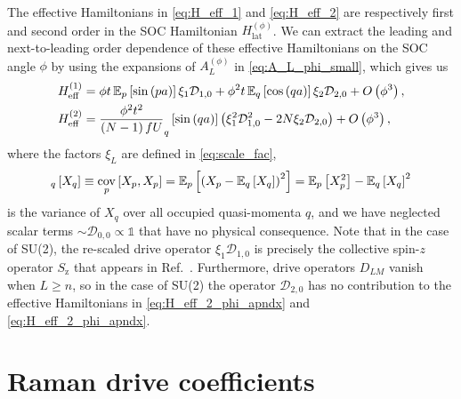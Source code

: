 \documentclass[nofootinbib,notitlepage,11pt]{revtex4-2}
\renewcommand{\t}{\text} %
\newcommand{\f}[2]{\dfrac{#1}{#2}} %
\newcommand{\p}[1]{\left(#1\right)} %
\renewcommand{\sp}[1]{\left[#1\right]} %
\newcommand{\1}{\mathds{1}}
\newcommand{\z}{\text{z}}
\newcommand{\D}{\mathcal{D}}
\newcommand{\EE}{\mathbb{E}}
\DeclareMathOperator{\cov}{cov}
\let\var\relax
\DeclareMathOperator{\var}{var}
\begin{document}
The effective Hamiltonians in \eqref{eq:H_eff_1} and
\eqref{eq:H_eff_2} are respectively first and second order in the SOC
Hamiltonian $H_{\t{lat}}^{(\phi)}$.  We can extract the leading and
next-to-leading order dependence of these effective Hamiltonians on
the SOC angle $\phi$ by using the expansions of $A_L^{(\phi)}$ in
\eqref{eq:A_L_phi_small}, which gives us
\begin{align}
  H_{\t{eff}}^{(1)}
  &= \phi t \, \EE_p\sp{\sin\p{pa}} \xi_1 \D_{1,0}
  + \phi^2 t \, \EE_q\sp{\cos\p{qa}} \xi_2 \D_{2,0}
  + O\p{\phi^3},
  \label{eq:H_eff_1_phi_apndx} \\
  H_{\t{eff}}^{(2)}
  &= \f{\phi^2 t^2}{\p{N-1}fU} \var_q\sp{\sin\p{qa}}
  \p{\xi_1^2 \D_{1,0}^2 - 2 N \xi_2 \D_{2,0}}
  + O\p{\phi^3},
  \label{eq:H_eff_2_phi_apndx}
\end{align}
where the factors $\xi_L$ are defined in \eqref{eq:scale_fac},
\begin{align}
  \var_q\sp{X_q} \equiv \cov_p\sp{X_p,X_p}
  = \EE_p\sp{\p{X_p-\EE_q\sp{X_q}}^2}
  = \EE_p\sp{X_p^2} - \EE_q\sp{X_q}^2
\end{align}
is the variance of $X_q$ over all occupied quasi-momenta $q$, and we
have neglected scalar terms $\sim\D_{0,0}\propto\1$ that have no
physical consequence.  Note that in the case of SU(2), the re-scaled
drive operator $\xi_1\D_{1,0}$ is precisely the collective spin-$z$
operator $S_\z$ that appears in Ref.~\cite{he2019engineering}.
Furthermore, drive operators $D_{LM}$ vanish when $L\ge n$, so in the
case of SU(2) the operator $\D_{2,0}$ has no contribution to the
effective Hamiltonians in \eqref{eq:H_eff_2_phi_apndx} and
\eqref{eq:H_eff_2_phi_apndx}.

\section{Raman drive coefficients}
\label{sec:drive_raman_coeff}
\end{document}

